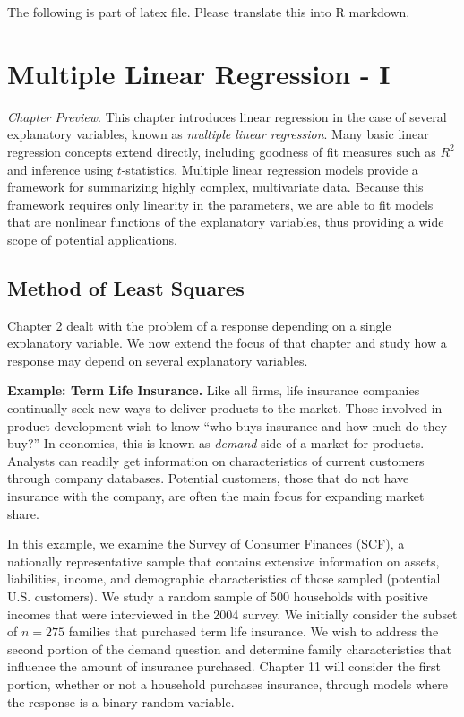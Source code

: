 The following is part of latex file. Please translate this into R markdown. \setcounter{chapter}{2}
\chapter{Multiple Linear Regression - I}

{\small \textit{Chapter Preview}. This chapter introduces linear
regression in the case of several explanatory variables, known as
\emph{multiple linear regression}. Many basic linear regression
concepts extend directly, including goodness of fit measures such as
$R^2$ and inference using $t$-statistics. Multiple linear regression
models provide a framework for summarizing highly complex,
multivariate data. Because this framework requires only linearity in
the parameters, we are able to fit models that are nonlinear
functions of the explanatory variables, thus providing a wide scope
of potential applications.}

\section{Method of Least Squares}\label{S3:LSMethod}

Chapter 2 dealt with the problem of a response depending on a single
explanatory variable. We now extend the focus of that chapter and study how
a response may depend on several explanatory variables.

\linejed


\textbf{Example: Term Life Insurance.} Like all firms, life insurance companies continually
seek new ways to deliver products to the market. Those involved in
product development wish to know ``who buys insurance and how much
do they buy?'' In economics, this is known as \emph{demand} side of
a market for products. Analysts can readily get information on
characteristics of current customers through company databases.
Potential customers, those that do not have insurance with the
company, are often the main focus for expanding market share.

In this example, we examine the Survey of Consumer Finances (SCF), a
nationally representative sample that contains extensive information
on assets, liabilities, income, and demographic characteristics of
those sampled (potential U.S. customers). We study a random sample
of 500 households with positive incomes that were interviewed in the
2004 survey. We initially consider the subset of $n=275$ families
that purchased term life insurance. We wish to address the second
portion of the demand question and determine family characteristics
that influence the amount of insurance purchased. Chapter 11 will
consider the first portion, whether or not a household purchases
insurance, through models where the response is a binary random
variable.

